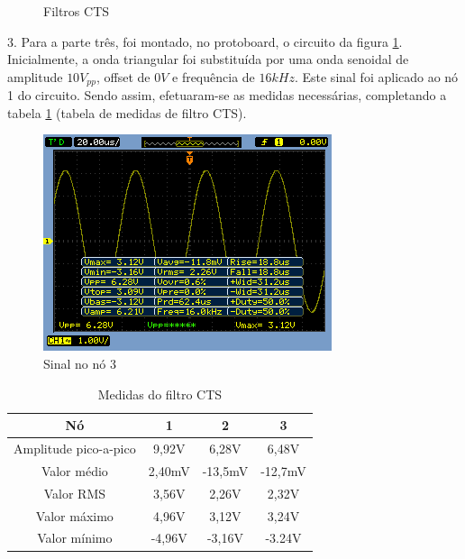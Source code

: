 \documentclass[a4paper]{article} %
\begin{document}
\vspace{3mm}
\begin{figure}[h]
\centerline{}
\caption{Filtros CTS \label{tab:circ}}
\end{figure}

\vspace{2mm}


3. Para a parte três, foi montado, no protoboard, o circuito da figura \ref{tab:circ}. Inicialmente, a onda triangular foi substituída por uma onda senoidal de amplitude $10V_{pp}$, offset de $0V$ e frequência de $16kHz$. Este sinal foi aplicado ao nó 1 do circuito. Sendo assim, efetuaram-se as medidas necessárias, completando a tabela \ref{tab:Medidas-do-filtro} (tabela de medidas de filtro CTS).

\begin{figure}[h!]
\begin{centering}
\includegraphics[scale=0.7]{Imagens/3}\caption{Sinal no nó 3 \label{fig:Fig-3}}
\par\end{centering}
\end{figure}
\newpage
%
\begin{table}[h!]
\begin{centering}
\caption{Medidas do filtro CTS \label{tab:Medidas-do-filtro}}
\begin{tabular}{|c|c|c|c|}
\hline 
Nó & 1 & 2 & 3\tabularnewline
\hline
\hline 
Amplitude pico-a-pico & 9,92V  & 6,28V  & 6,48V \tabularnewline
\hline 
Valor médio & 2,40mV & -13,5mV  & -12,7mV \tabularnewline
\hline 
Valor RMS & 3,56V & 2,26V  & 2,32V \tabularnewline
\hline 
Valor máximo & 4,96V & 3,12V  & 3,24V \tabularnewline
\hline 
Valor mínimo & -4,96V  & -3,16V  & -3.24V \tabularnewline
\hline
\end{tabular}
\par\end{centering}


\end{table}
\end{document}
